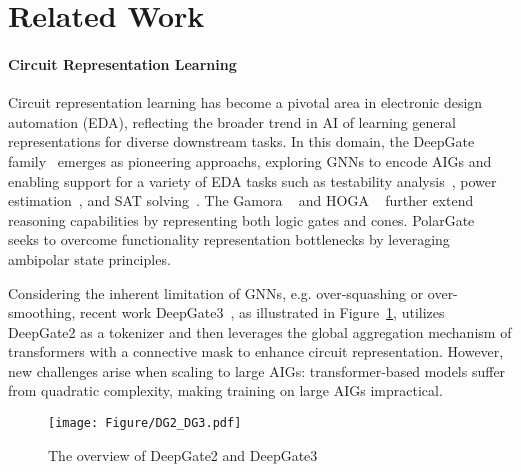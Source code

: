 \section{Related Work}
\vspace{-10pt}
\paragraph{Circuit Representation Learning}
Circuit representation learning has become a pivotal area in electronic design automation (EDA), reflecting the broader trend in AI of learning general representations for diverse downstream tasks. In this domain, the DeepGate family~\citep{li2022deepgate, shi2023deepgate2} emerges as pioneering approachs, exploring GNNs to encode AIGs and enabling support for a variety of EDA tasks such as testability analysis~\citep{shi2022deeptpi}, power estimation~\citep{khan2023deepseq}, and SAT solving~\citep{li2023eda, shi2024eda}. The Gamora ~\citep{wu2023gamora} and HOGA ~\citep{deng2024less} further extend reasoning capabilities by representing both logic gates and cones. PolarGate~\citep{PolarGate} seeks to overcome functionality representation bottlenecks by leveraging ambipolar state principles. 

Considering the inherent limitation of GNNs, e.g. over-squashing or over-smoothing, recent work DeepGate3~\citep{shi2024deepgate3}, as illustrated in Figure~\ref{fig:DG2_DG3}, utilizes DeepGate2 as a tokenizer and then leverages the global aggregation mechanism of transformers with a connective mask to enhance circuit representation. However, new challenges arise when scaling to large AIGs: transformer-based models suffer from quadratic complexity, making training on large AIGs impractical.
\vspace{-5pt}

\begin{figure}
    \centering
    \texttt{[image: Figure/DG2\_DG3.pdf]}
    \vspace{-12pt}
    \caption{The overview of DeepGate2 and DeepGate3}
    \label{fig:DG2_DG3}
    \vspace{-19pt}
\end{figure}

